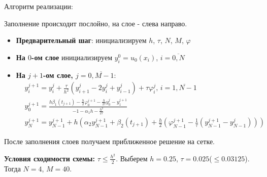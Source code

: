 Алгоритм реализации:\par
Заполнение происходит послойно, на слое - слева направо.
\begin{itemize}
\item \textbf{Предварительный шаг}: инициализируем $h$, $\tau$, $N$, $M$, $\varphi$
\item \textbf{На $0$-ом слое} инициализируем $y_{i}^{0} = u_{0}(x_{i})$, $i=\overline{0,N}$
\item { \textbf{На $j+1$-ом слое, $j=\overline{0,M-1}$}:
\begin{eqnarray*}
& y_{i}^{j+1} = y_{i}^{j} + \frac{\tau}{h^{2}}(y_{i+1}^{j} - 2y_{i}^{j} + y_{i-1}^{j}) + \tau\varphi_{i}^{j}\text{, }i=\overline{1,N-1} \\
& y_{0}^{j+1} = \frac{h \beta_{1}(t_{j+1}) -\frac{h}{2}\varphi_{0}^{j+1} -\frac{h}{2\tau}y_{0}^{j}-y_{1}^{j+1}}{-1-\alpha_{1}h-\frac{h^{2}}{2\tau}} \\
& y_{N}^{j+1} = y_{N-1}^{j+1} + h(\alpha_{2}y_{N-1}^{j+1}+\beta_{2}(t_{j+1})+ \frac{h}{2}(\varphi_{N-1}^{j+1}-\frac{1}{\tau}(y_{N-1}^{j+1}-y_{N-1}^{j})))
\end{eqnarray*}
}
\end{itemize} \par
После заполнения слоев получаем приближенное решение на сетке. \par
\textbf{Условия сходимости схемы:} $\tau \le \frac{h^{2}}{2}$. Выберем $h=0.25$, $\tau=0.025$($\le 0.03125$). Тогда $N=4$, $M=40$. \par

